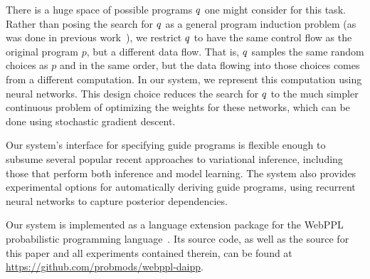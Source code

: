 There is a huge space of possible programs $q$ one might consider for this task. Rather than posing the search for $q$ as a general program induction problem (as was done in previous work~\cite{GuidePrograms}), we restrict $q$ to have the same control flow as the original program $p$, but a different data flow.
That is, $q$ samples the same random choices as $p$ and in the same order, but the data flowing into those choices comes from a different computation.
In our system, we represent this computation using neural networks.
This design choice reduces the search for $q$ to the much simpler continuous problem of optimizing the weights for these networks, which can be done using stochastic gradient descent.

Our system's interface for specifying guide programs is flexible enough to subsume several popular recent approaches to variational inference, including those that perform both inference and model learning. The system also provides experimental options for automatically deriving guide programs, using recurrent neural networks to capture posterior dependencies.~

Our system is implemented as a language extension package for the WebPPL probabilistic programming language~\cite{WebPPL}. Its source code, as well as the source for this paper and all experiments contained therein, can be found at \url{https://github.com/probmods/webppl-daipp}.
